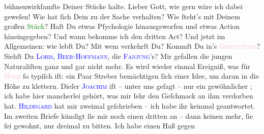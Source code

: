                bühnenwirkſamſte Deiner Stücke halte. Lieber Gott, wie gern wäre ich dabei geweſen!
               Wie hat ſich Dein \label{K_L02661-4v}\label{K_L02661-4h}
               zu der Sache verhalten? Wie ſteht’s mit Deinem großen \textcolor{green}{Stück}{}? Haſt Du etwas
               Pſychologie hinausgeworfen und etwas Action hineingegeben? Und wann bekomme ich den
               dritten Act? {\dotsfive}\pend
           \pstart
           Und jetzt im Allgemeinen: wie lebſt Du? Mit wem verkehrſt Du? Kommſt Du in’s \textsc{\textcolor{pink}{Griensteidl}{}\ledrightnote{\textcolor{pink}{Café Griensteidl}}}? Siehſt Du \textsc{\textcolor{blue}{Loris}{}}, {\pb}\textsc{\textcolor{blue}{Beer-Hoffmann}{}\ledrightnote{\textcolor{blue}{Richard Beer-Hofmann}}}, die \textsc{\textcolor{blue}{Fanjung}{}}’s?\pend
           \pstart
           Mir gefallen die jungen Naturaliſten ganz und gar nicht mehr. Es wird wieder einmal
               Ereigniß, was für \textcolor{pink}{Wien}{}\ledrightnote{\textcolor{pink}{Wien}} ſo  typiſch iſt: ein Paar Streber bemächtigen ſich einer Idee, um daran in die
               Höhe zu klettern. Dieſer \textsc{\textcolor{blue}{Joachim}{}\ledrightnote{\textcolor{blue}{Jaques Joachim}}} iſt – unter uns geſagt – nur ein gewöhnlicher \label{K_L02661-5v}\label{K_L02661-5h}; ich habe
               hier mancherlei gehört, was mir ſehr den Geſchmack an ihm verdorben hat.\pend
           \pstart
           \textsc{\textcolor{blue}{Hildegard}{}} hat mir zweimal geſchrieben –  ich habe
               ihr keinmal geantwortet. Im zweiten Briefe kündigt ſie mir noch einen dritten an –
               dann keinen mehr, ſie ſei gewohnt, nur dreimal zu bitten. Ich habe einen Haß gegen
